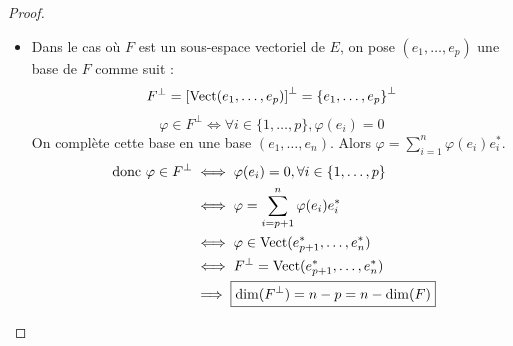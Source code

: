 \documentclass[11pt,a4paper]{report}
\begin{document}
\begin{proof}
    \begin{itemize}
        \item Dans le cas où $F$ est un sous-espace vectoriel de $E$, on pose $(e_1,\dots,e_p)$ une base de $F$ comme suit :
        $$F^\perp = \left[\mathrm{Vect}(e_1, \dots, e_p)\right]^\perp = \left\{e_1, \dots, e_p\right\}^\perp$$
        $$\varphi \in F^\perp \iff \forall i \in \{1, \dots, p\}, \varphi(e_i) = 0$$
        On complète cette base en une base $(e_1, \dots, e_n)$. Alors $\varphi = \sum_{i=1}^n \varphi(e_i)e_i^*$.
        \begin{align*}
            \text{ donc } \varphi \in F^\perp &\iff \varphi(e_i) = 0, \forall i \in \{1, \dots, p\} \\
            &\iff \varphi = \sum_{i=p+1}^n \varphi(e_i)e_i^* \\
            &\iff \varphi \in \mathrm{Vect}(e_{p+1}^*, \dots, e_n^*) \\
            &\iff F^\perp = \mathrm{Vect}(e_{p+1}^*, \dots, e_n^*) \\
            &\implies \boxed{\dim(F^\perp) = n - p = n - \dim(F)}
        \end{align*}
    \end{itemize}
\end{proof}
\end{document}

